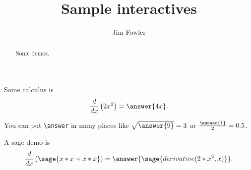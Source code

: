 \documentclass{ximera}
\title{Sample interactives}
\author{Jim Fowler}
\begin{document}
\begin{abstract}
Some demos.
\end{abstract}
\maketitle


\begin{problem}
  Some calculus is
  \[
    \frac{d}{dx} \left( 2x^2 \right) = \answer{4x}.
  \]

  You can put \verb|\answer| in many places
    like \(\sqrt{\answer{9}} = 3\)
    or \(\frac{\answer{1}}{2} = 0.5\). 
\end{problem}


\begin{problem}
  A sage demo is
  \[
    \frac{d}{dx} \left( \sage{x*x + x*x} \right) =
      \answer{\sage{derivative(2*x^2,x)}}.
  \]
\end{problem}
\end{document}
